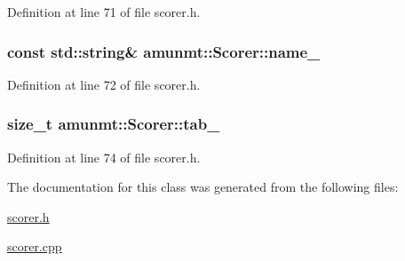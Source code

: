 Definition at line 71 of file scorer.\+h.

\subsubsection[{\texorpdfstring{name\+\_\+}{name_}}]{\setlength{\rightskip}{0pt plus 5cm}const std\+::string\& amunmt\+::\+Scorer\+::name\+\_\+\hspace{0.3cm}{\ttfamily [protected]}}\hypertarget{classamunmt_1_1Scorer_a2a39ede273658e478ba0d703a50b268a}{}\label{classamunmt_1_1Scorer_a2a39ede273658e478ba0d703a50b268a}


Definition at line 72 of file scorer.\+h.

\subsubsection[{\texorpdfstring{tab\+\_\+}{tab_}}]{\setlength{\rightskip}{0pt plus 5cm}size\+\_\+t amunmt\+::\+Scorer\+::tab\+\_\+\hspace{0.3cm}{\ttfamily [protected]}}\hypertarget{classamunmt_1_1Scorer_a298909a9f62e9ac346c74084fa932556}{}\label{classamunmt_1_1Scorer_a298909a9f62e9ac346c74084fa932556}


Definition at line 74 of file scorer.\+h.



The documentation for this class was generated from the following files\+:\begin{DoxyCompactItemize}
\item 
\hyperlink{scorer_8h}{scorer.\+h}\item 
\hyperlink{scorer_8cpp}{scorer.\+cpp}\end{DoxyCompactItemize}
